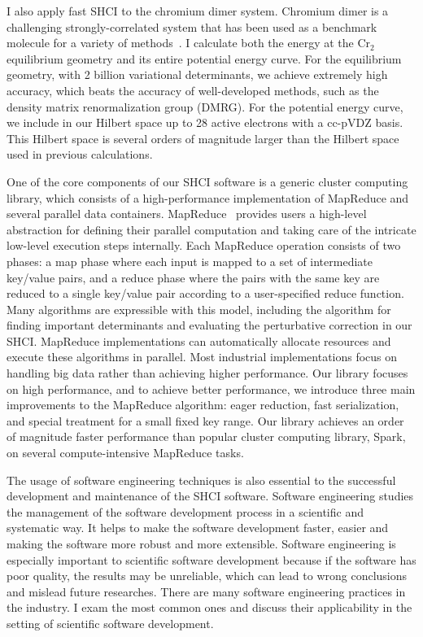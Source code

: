 \documentclass[phd,tocprelim]{cornell}
\begin{document}
I also apply fast SHCI to the chromium dimer system.
Chromium dimer is a challenging strongly-correlated system that has been used as a benchmark molecule for a variety of methods~\cite{Scu-JCP-91,KurYan-JCP-11,PurZhaKra-JCP-15,MaManOlsGag-JCTC-16,VanMalVer-JCTC-16,GuoWatHuSunCha-JCTC-16}.
I calculate both the energy at the Cr$_2$ equilibrium geometry and its entire potential energy curve.
For the equilibrium geometry, with 2 billion variational determinants, we achieve extremely high accuracy, which beats the accuracy of well-developed methods, such as the density matrix renormalization group (DMRG).
For the potential energy curve, we include in our Hilbert space up to 28 active electrons with a cc-pVDZ basis.
This Hilbert space is several orders of magnitude larger than the Hilbert space used in previous calculations.

One of the core components of our SHCI software is a generic cluster computing library, which consists of a high-performance implementation of MapReduce and several parallel data containers.
MapReduce~\cite{dean2008mapreduce,dean2010mapreduce} provides users a high-level abstraction for defining their parallel computation and taking care of the intricate low-level execution steps internally.
Each MapReduce operation consists of two phases: a map phase where each input is mapped to a set of intermediate key/value pairs, and a reduce phase where the pairs with the same key are reduced to a single key/value pair according to a user-specified reduce function.
Many algorithms are expressible with this model, including the algorithm for finding important determinants and evaluating the perturbative correction in our SHCI.
MapReduce implementations can automatically allocate resources and execute these algorithms in parallel.
Most industrial implementations focus on handling big data rather than achieving higher performance.
Our library focuses on high performance, and to achieve better performance, we introduce three main improvements to the MapReduce algorithm: eager reduction, fast serialization, and special treatment for a small fixed key range.
Our library achieves an order of magnitude faster performance than popular cluster computing library, Spark, on several compute-intensive MapReduce tasks.

The usage of software engineering techniques is also essential to the successful development and maintenance of the SHCI software.
Software engineering studies the management of the software development process in a scientific and systematic way.
It helps to make the software development faster, easier and making the software more robust and more extensible.
Software engineering is especially important to scientific software development because if the software has poor quality, the results may be unreliable, which can lead to wrong conclusions and mislead future researches.
There are many software engineering practices in the industry.
I exam the most common ones and discuss their applicability in the setting of scientific software development.
\end{document}
